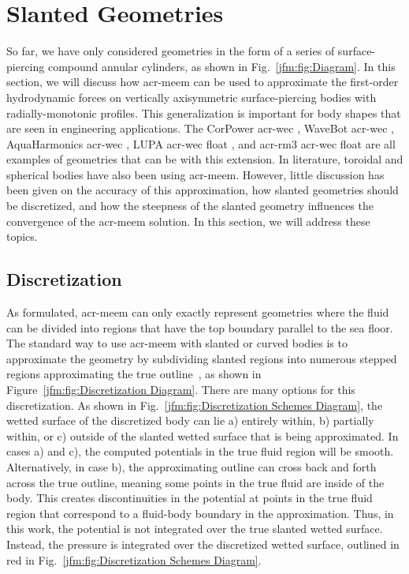\documentclass[ASNA,twocolumn]{USG} %
\begin{document}
\section{Slanted Geometries}\label{jfm:sec:slant}
So far, we have only considered geometries in the form of a series of surface-piercing compound annular cylinders, as shown in Fig.~\ref{jfm:fig:Diagram}. 
In this section, we will discuss how \gls{acr-meem} can be used to approximate the first-order hydrodynamic forces on vertically axisymmetric surface-piercing bodies with radially-monotonic profiles. 
This generalization is important for \modelling{} body shapes that are seen in engineering applications. 
The CorPower \gls{acr-wec} \citep{de2016techno}, WaveBot \gls{acr-wec} \citep{strofer2023control}, AquaHarmonics \gls{acr-wec} \citep{weaver2020super}, LUPA \gls{acr-wec} float \citep{beringer2025degrees}, and \gls{acr-rm3} \gls{acr-wec} float \citep{neary2014methodology} are all examples of geometries that can be \modelled{} with this extension. 
In literature, toroidal \citep{mavrakos1997hydrodynamic} and spherical bodies \citep{zhang_hydrodynamic_2016} have also been \modelled{} using \gls{acr-meem}. 
However, little discussion has been given on the accuracy of this approximation, how slanted geometries should be discretized, and how the steepness of the slanted geometry influences the convergence of the \gls{acr-meem} solution. 
In this section, we will address these topics.

\subsection{Discretization}

As formulated, \gls{acr-meem} can only exactly represent geometries where the fluid can be divided into regions that have the top boundary parallel to the sea floor.
The standard way to use \gls{acr-meem} with slanted or curved bodies is to approximate the geometry by subdividing slanted regions into numerous stepped regions approximating the true outline~\citep{kokkinowrachos_behaviour_1986}, as shown in Figure~\ref{jfm:fig:Discretization Diagram}.
There are many options for this discretization.
As shown in Fig.~\ref{jfm:fig:Discretization Schemes Diagram}, the wetted surface of the discretized body \modelled{} can lie a) entirely within, b) partially within, or c) outside of the slanted wetted surface that is being approximated.
In cases a) and c), the computed potentials in the true fluid region will be smooth.
Alternatively, in case b), the approximating outline can cross back and forth across the true outline, meaning some points in the true fluid are inside of the body.
This creates discontinuities in the potential at points in the true fluid region that correspond to a fluid-body boundary in the approximation.
Thus, in this work, the potential is not integrated over the true slanted wetted surface.
Instead, the pressure is integrated over the discretized wetted surface, outlined in red in Fig.~\ref{jfm:fig:Discretization Schemes Diagram}.
\end{document}
